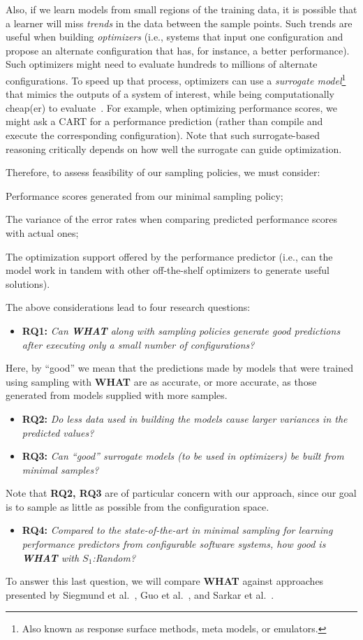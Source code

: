 \documentclass{newsig}
\newcommand{\bi}{\begin{itemize}}%
\newcommand{\ei}{\end{itemize}}
\newcommand{\what}{{\bf WHAT }}
\begin{document}
Also, if we learn models from small regions of the training data,
it is  possible that a learner will miss {\em trends} in the data
between the sample points. Such trends are useful when building {\em optimizers}
(i.e., systems that input one configuration and propose an alternate
configuration that has, for instance,  a better performance). Such optimizers might
need to evaluate hundreds to millions of alternate configurations. 
To speed up that process, optimizers can use a {\em surrogate model}\footnote{Also known as response surface methods, meta models, or emulators.}
that  mimics the outputs of a system of interest, while being computationally cheap(er) to evaluate~\cite{loshchilov13}. For example, when optimizing
performance scores, we might ask a CART  for a performance
prediction (rather than compile and execute
the corresponding configuration).  Note that such surrogate-based
reasoning critically depends on how well the surrogate can guide optimization.


Therefore, to assess feasibility of our sampling policies, we must consider:
\begin{compactitem}
\item Performance scores generated from our minimal sampling policy;
\item The variance of the error rates when comparing predicted performance scores with actual ones;
\item The optimization support offered by the performance predictor (i.e., can the model work in tandem with other off-the-shelf optimizers to generate useful solutions).
\end{compactitem}
The above considerations lead to four research questions:
\bi
\item {\bf RQ1:} {\em Can  \what along with sampling policies generate good predictions after
executing only a small number of configurations?}
\ei
Here, by ``good'' we mean that the predictions made by models that were trained using sampling with \what are as accurate, or more accurate,
as those generated from models supplied with more samples.
\bi
\item {\bf RQ2:} {\em
Do less data used in building the models cause larger variances in the predicted values?}
\item {\bf RQ3:} {\em
Can ``good'' surrogate models (to be used in optimizers)
be built from minimal samples?}
\ei
Note that {\bf RQ2, RQ3} are of particular concern with our approach,
since our goal is to sample as little as possible from the configuration space.
\bi
\item {\bf RQ4:} {\em Compared to the state-of-the-art in minimal sampling for
learning performance predictors from configurable software systems, how good is \what with $S_1$:Random?}
\ei
To answer this last question, we will compare \what 
          against approaches presented by Siegmund et al.~\cite{siegmund2012predicting}, Guo et al.~\cite{guo2013variability}, and Sarkar et al.~\cite{sarkar2015cost}.
 
\end{document}
